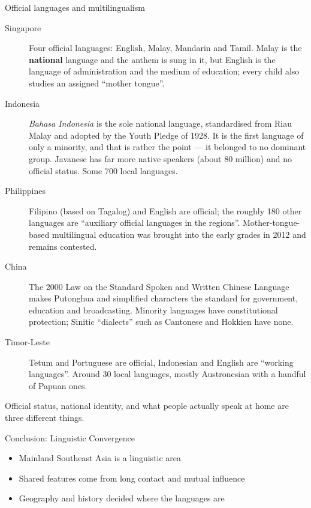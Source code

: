 \documentclass{beamer}
\begin{document}
\begin{frame}[allowframebreaks]{Official languages and multilingualism}

  \begin{description}
  \item[Singapore] Four official languages: English, Malay, Mandarin and
    Tamil. Malay is the \textbf{national} language and the anthem is sung in
    it, but English is the language of administration and the medium of
    education; every child also studies an assigned ``mother tongue''.
  \item[Indonesia] \textit{Bahasa Indonesia} is the sole national language,
    standardised from Riau Malay and adopted by the Youth Pledge of 1928.
    It is the first language of only a minority, and that is rather the
    point --- it belonged to no dominant group. Javanese has far more
    native speakers (about 80 million) and no official status. Some 700
    local languages.
  \item[Philippines] Filipino (based on Tagalog) and English are official;
    the roughly 180 other languages are ``auxiliary official languages in
    the regions''. Mother-tongue-based multilingual education was brought
    into the early grades in 2012 and remains contested.
  \item[China] The 2000 Law on the Standard Spoken and Written Chinese
    Language makes Putonghua and simplified characters the standard for
    government, education and broadcasting. Minority languages have
    constitutional protection; Sinitic ``dialects'' such as Cantonese and
    Hokkien have none.
  \item[Timor-Leste] Tetum and Portuguese are official, Indonesian and
    English are ``working languages''. Around 30 local languages, mostly
    Austronesian with a handful of Papuan ones.
  \end{description}

  \bigskip

  Official status, national identity, and what people actually speak at
  home are three different things.

\end{frame}

\begin{frame}{Conclusion: Linguistic Convergence}
    \begin{itemize}
        \item Mainland Southeast Asia is a linguistic area
        \item Shared features come from long contact and mutual influence
        \item Geography and history decided where the languages are
    \end{itemize}
\end{frame}
\end{document}

